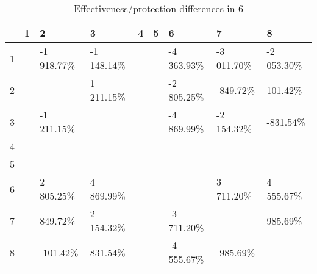 \begin{table}[ht]
\centering
\begin{tabular}{rllllllll}
  \hline
 & 1 & 2 & 3 & 4 & 5 & 6 & 7 & 8 \\ 
  \hline
1 &  & -1 918.77\% & -1 148.14\% &  &  & -4 363.93\% & -3 011.70\% & -2 053.30\% \\ 
  2 &  &  & 1 211.15\% &  &  & -2 805.25\% & -849.72\% & 101.42\% \\ 
  3 &  & -1 211.15\% &  &  &  & -4 869.99\% & -2 154.32\% & -831.54\% \\ 
  4 &  &  &  &  &  &  &  &  \\ 
  5 &  &  &  &  &  &  &  &  \\ 
  6 &  & 2 805.25\% & 4 869.99\% &  &  &  & 3 711.20\% & 4 555.67\% \\ 
  7 &  & 849.72\% & 2 154.32\% &  &  & -3 711.20\% &  & 985.69\% \\ 
  8 &  & -101.42\% & 831.54\% &  &  & -4 555.67\% & -985.69\% &  \\ 
   \hline
\end{tabular}
\caption{Effectiveness/protection differences in  6} 
\end{table}
